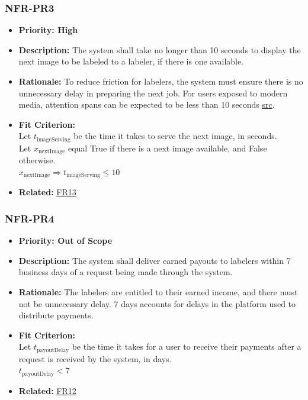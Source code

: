 \documentclass[12pt]{article}
\begin{document}
\subsubsection*{NFR-PR3}
\label{sec:PR3}
\begin{itemize}
  \item \textbf{Priority: High}
  \item \textbf{Description:} The system shall take no longer than 10 seconds to display the next image to be labeled to a labeler, if there is one available.
  \item \textbf{Rationale:} To reduce friction for labelers, the system must ensure there is no unnecessary delay in preparing the next job. For users exposed to modern media, attention spans can be expected to be less than 10 seconds \href{https://profiletree.com/attention-span-crisis-digital-age-statistics/#:~:text=Studies%20have%20proven%20that%20being,focus%20after%208%20mere%20seconds}{src}.
  \item \textbf{Fit Criterion:}\\ Let $t_{\text{imageServing}}$ be the time it takes to serve the next image, in seconds.\\
  Let $x_{\text{nextImage}}$ equal True if there is a next image available, and False otherwise.\\
  $x_{\text{nextImage}} \Rightarrow t_{\text{imageServing}} \leq 10$
  \item \textbf{Related:} \hyperref[sec:FR13]{FR13}
\end{itemize}

\subsubsection*{NFR-PR4}
\label{sec:PR4}
\begin{itemize}
  \item \textbf{Priority: Out of Scope}
  \item \textbf{Description:} The system shall deliver earned payouts to labelers within 7 business days of a request being made through the system.
  \item \textbf{Rationale:} The labelers are entitled to their earned income, and there must not be unnecessary delay. 7 days accounts for delays in the platform used to distribute payments.
  \item \textbf{Fit Criterion:}\\ Let $t_{\text{payoutDelay}}$ be the time it takes for a user to receive their payments after a request is received by the system, in days.\\
  $t_{\text{payoutDelay}} < 7$
  \item \textbf{Related:} \hyperref[sec:FR12]{FR12}
\end{itemize}
\end{document}
